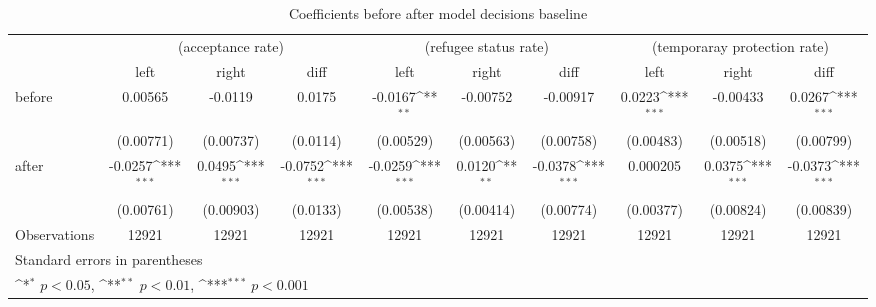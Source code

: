 \begin{table}[!ht]\centering \scriptsize
	\def\sym#1{\ifmmode^{#1}\else\(^{#1}\)\fi}
	\caption{Coefficients before after model decisions baseline}
	\begin{tabular}{l*{9}{c}}
		\hline\hline
		&\multicolumn{3}{c}{(acceptance rate)}&\multicolumn{3}{c}{(refugee status rate)}&\multicolumn{3}{c}{(temporaray protection rate)}\\
		&\multicolumn{1}{c}{left}&\multicolumn{1}{c}{right}&\multicolumn{1}{c}{diff}&\multicolumn{1}{c}{left}&\multicolumn{1}{c}{right}&\multicolumn{1}{c}{diff}&\multicolumn{1}{c}{left}&\multicolumn{1}{c}{right}&\multicolumn{1}{c}{diff}\\
\hline
before              &     0.00565         &     -0.0119         &      0.0175         &     -0.0167\sym{**} &    -0.00752         &    -0.00917         &      0.0223\sym{***}&    -0.00433         &      0.0267\sym{***}\\
                    &   (0.00771)         &   (0.00737)         &    (0.0114)         &   (0.00529)         &   (0.00563)         &   (0.00758)         &   (0.00483)         &   (0.00518)         &   (0.00799)         \\
[1em]
after               &     -0.0257\sym{***}&      0.0495\sym{***}&     -0.0752\sym{***}&     -0.0259\sym{***}&      0.0120\sym{**} &     -0.0378\sym{***}&    0.000205         &      0.0375\sym{***}&     -0.0373\sym{***}\\
                    &   (0.00761)         &   (0.00903)         &    (0.0133)         &   (0.00538)         &   (0.00414)         &   (0.00774)         &   (0.00377)         &   (0.00824)         &   (0.00839)         \\
\hline
Observations        &       12921         &       12921         &       12921         &       12921         &       12921         &       12921         &       12921         &       12921         &       12921         \\
\hline\hline
\multicolumn{10}{l}{\footnotesize Standard errors in parentheses}\\
\multicolumn{10}{l}{\footnotesize \sym{*} \(p<0.05\), \sym{**} \(p<0.01\), \sym{***} \(p<0.001\)}\\
\end{tabular}
\end{table}
